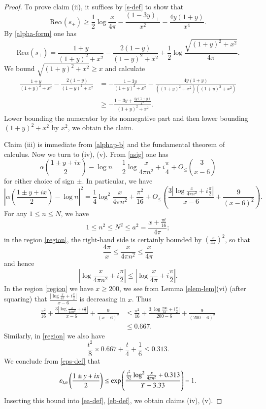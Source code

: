 \begin{proof}
To prove claim (ii), it suffices by \eqref{s-def} to show that
$$ \mathrm{Re} \alpha(s_+) \geq \frac{1}{2} \log \frac{x}{4\pi} - \frac{(1-3y)_+}{x^2} - \frac{4y(1+y)}{x^4}.$$
By \eqref{alpha-form} one has
$$ \mathrm{Re} \alpha(s_+) = \frac{1+y}{(1+y)^2+x^2} - \frac{2(1-y)}{(1-y)^2+x^2} + \frac{1}{2} \log \frac{\sqrt{(1+y)^2+x^2}}{4\pi}.$$
We bound $\sqrt{(1+y)^2+x^2} \geq x$ and calculate
\begin{align*}
 \frac{1+y}{(1+y)^2+x^2} - \frac{2(1-y)}{(1-y)^2+x^2} &= - \frac{1-3y}{(1+y)^2+x^2} -\frac{4y(1+y)}{((1+y)^2+x^2)((1+y)^2+x^2)} \\
&\geq - \frac{1-3y+\frac{4y(1+y)}{x^2}}{(1+y)^2+x^2}.
\end{align*}
Lower bounding the numerator by its nonnegative part and then lower bounding $(1+y)^2+x^2$ by $x^2$, we obtain the claim.

Claim (iii) is immediate from \eqref{alphap-b} and the fundamental theorem of calculus.  Now we turn to (iv), (v).  From \eqref{asig} one has
$$ \alpha\left(\frac{1 \pm y + ix}{2}\right) - \log n = \frac{1}{2} \log \frac{x}{4\pi n^2} + i \frac{\pi}{4} + O_{\leq}\left( \frac{3}{x-6}\right)$$
for either choice of sign $\pm$.  In particular, we have
\begin{equation}\label{alphn}
 \left|\alpha\left(\frac{1 \pm y + ix}{2}\right) - \log n\right|^2 = \frac{1}{4} \log^2 \frac{x}{4\pi n^2} + \frac{\pi^2}{16} + 
O_{\leq}\left( \frac{3 |\log \frac{x}{4\pi n^2} + i \frac{\pi}{2}|}{x-6} + \frac{9}{(x-6)^2}\right).
\end{equation}
For any $1 \leq n \leq N$, we have
$$ 1 \leq n^2 \leq N^2 \leq a^2 = \frac{x+\frac{\pi t}{16}}{4\pi};$$
in the region \eqref{region}, the right-hand side is certainly bounded by $(\frac{x}{4\pi})^2$, so that
$$ \frac{4\pi}{x} \leq \frac{x}{4\pi n^2} \leq \frac{x}{4\pi}$$
and hence
$$ \left|\log \frac{x}{4\pi n^2} + i \frac{\pi}{2}\right| \leq \left|\log \frac{x}{4\pi} + i \frac{\pi}{2}\right|.$$
In the region \eqref{region} we have  $x \geq 200$, we see from Lemma \ref{elem-lem}(vi) (after squaring) that $\frac{|\log \frac{x}{4\pi} + i \frac{\pi}{2}|}{x-6}$ is decreasing in $x$.  Thus
\begin{align*}
\frac{\pi^2}{16} + \frac{3 |\log \frac{x}{4\pi n^2} + i \frac{\pi}{2}|}{x-6} + \frac{9}{(x-6)^2}
&\leq \frac{\pi^2}{16} +  \frac{3 |\log \frac{200}{4\pi} + i \frac{\pi}{2}|}{200-6} + \frac{9}{(200-6)^2} \\
&\leq 0.667.
\end{align*}
Similarly, in \eqref{region} we also have
$$ \frac{t^2}{8} \times 0.667 + \frac{t}{4} + \frac{1}{6} \leq 0.313.$$ 
We conclude from \eqref{eps-def} that
$$
\varepsilon_{t,n}\left(\frac{1 \pm y + ix}{2} \right) \leq \exp\left( \frac{\frac{t^2}{32} \log^2 \frac{x}{4\pi n^2} + 0.313}{T-3.33} \right)-1.$$
Inserting this bound into \eqref{ea-def}, \eqref{eb-def}, we obtain claims (iv), (v).


\end{proof}
